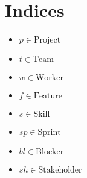 \documentclass[11pt]{article}
\begin{document}
\section{Indices}
\begin{itemize}
    \item $p \in \text{Project}$
    \item $t \in \text{Team}$
    \item $w \in \text{Worker}$
    \item $f \in \text{Feature}$
    \item $s \in \text{Skill}$
    \item $sp \in \text{Sprint}$
    \item $bl \in \text{Blocker}$
    \item $sh \in \text{Stakeholder}$
\end{itemize}
\end{document}
